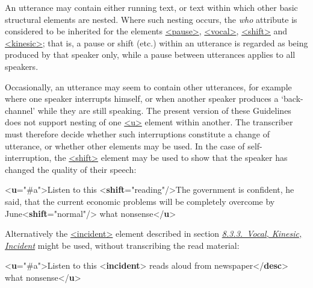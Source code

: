An utterance may contain either running text, or text within which other basic structural elements are nested. Where such nesting occurs, the {\itshape who} attribute is considered to be inherited for the elements \hyperref[TEI.pause]{<pause>}, \hyperref[TEI.vocal]{<vocal>}, \hyperref[TEI.shift]{<shift>} and \hyperref[TEI.kinesic]{<kinesic>}; that is, a pause or shift (etc.) within an utterance is regarded as being produced by that speaker only, while a pause between utterances applies to all speakers.\par
Occasionally, an utterance may seem to contain other utterances, for example where one speaker interrupts himself, or when another speaker produces a ‘back-channel’ while they are still speaking. The present version of these Guidelines does not support nesting of one \hyperref[TEI.u]{<u>} element within another. The transcriber must therefore decide whether such interruptions constitute a change of utterance, or whether other elements may be used. In the case of self-interruption, the \hyperref[TEI.shift]{<shift>} element may be used to show that the speaker has changed the quality of their speech: \par\bgroup{}\exampleFont \begin{shaded}\noindent\mbox{}{<\textbf{u}\hspace*{1em}{who}="{\#a}">}Listen to this {<\textbf{shift}\hspace*{1em}{new}="{reading}"/>}The government is\mbox{}\newline 
 confident, he said, that the current economic problems will be\mbox{}\newline 
 completely overcome by June{<\textbf{shift}\hspace*{1em}{new}="{normal}"/>} what nonsense{</\textbf{u}>}\end{shaded}\egroup\par \noindent  Alternatively the \hyperref[TEI.incident]{<incident>} element described in section \textit{\hyperref[TSBAVO]{8.3.3.\ Vocal, Kinesic, Incident}} might be used, without transcribing the read material: \par\bgroup{}\exampleFont \begin{shaded}\noindent\mbox{}{<\textbf{u}\hspace*{1em}{who}="{\#a}">}Listen to this\mbox{}\newline 
{<\textbf{incident}>}\mbox{}\newline 
\hspace*{1em}reads aloud from newspaper{</\textbf{desc}>}\mbox{}\newline 
{} what\mbox{}\newline 
 nonsense{</\textbf{u}>}\end{shaded}\egroup\par \par
